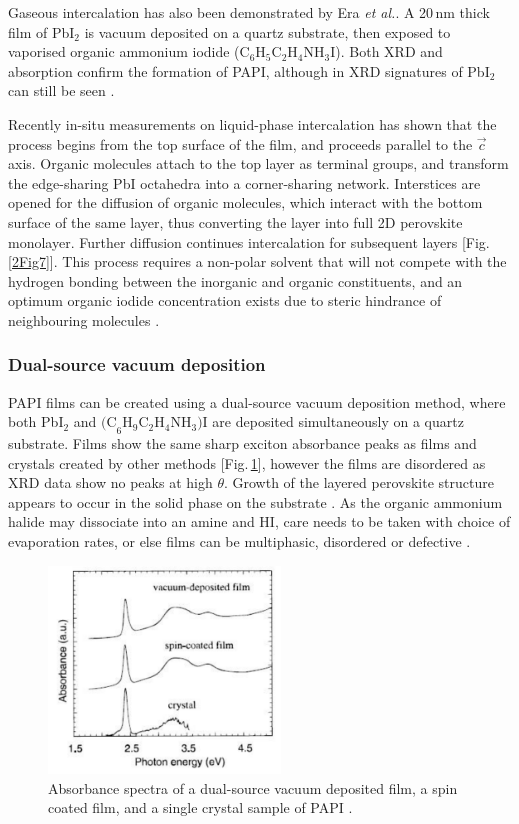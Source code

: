 Gaseous intercalation has also been demonstrated by Era \textit{et al.}. A 20\,nm thick film of Pb$\textrm{I}_2$ is vacuum deposited on a quartz substrate, then exposed to vaporised organic ammonium iodide ($\textrm{C}_6\textrm{H}_5\textrm{C}_2\textrm{H}_4\textrm{NH}_3\textrm{I}$). Both XRD and absorption confirm the formation of PAPI, although in XRD signatures of Pb$\textrm{I}_2$ can still be seen \cite{Era1998}.

Recently in-situ measurements on liquid-phase intercalation has shown that the process begins from the top surface of the  film, and proceeds parallel to the $\vec{c}$ axis. Organic molecules attach to the top  layer as terminal groups, and transform the edge-sharing PbI octahedra into a corner-sharing network. Interstices are opened for the diffusion of organic molecules, which interact with the bottom surface of the same layer, thus converting the  layer into full 2D perovskite monolayer. Further diffusion continues intercalation for subsequent layers [Fig.\,\ref{2Fig7}]. This process requires a non-polar solvent that will not compete with the hydrogen bonding between the inorganic and organic constituents, and an optimum organic iodide concentration exists due to steric hindrance of neighbouring molecules \cite{Ahmad2014}.

\subsubsection{Dual-source vacuum deposition}
PAPI films can be created using a dual-source vacuum deposition method, where both Pb$\textrm{I}_2$ and $\textrm{(C}_6\textrm{H}_9\textrm{C}_2\textrm{H}_4\textrm{NH}_3)\textrm{I}$ are deposited simultaneously on a quartz substrate. Films show the same sharp exciton absorbance peaks as films and crystals created by other methods [Fig.\,\ref{2Fig8}], however the films are disordered as XRD data show no peaks at high $\theta$. Growth of the layered perovskite structure appears to occur in the solid phase on the substrate \cite{Era1997}. As the organic ammonium halide may dissociate into an amine and HI, care needs to be taken with choice of evaporation rates, or else films can be multiphasic, disordered or defective \cite{Mitzi1999}.
\begin{figure}[h!]
\centering
\includegraphics[width=0.55\textwidth]{Fig8}
\caption{Absorbance spectra of a dual-source vacuum deposited film, a spin coated film, and a single crystal sample of PAPI \cite{Era1997}.}
\label{2Fig8}
\end{figure}

